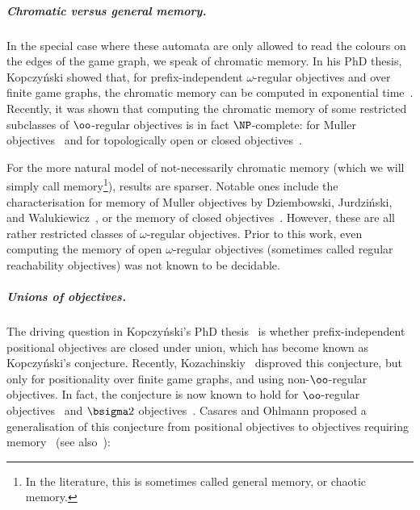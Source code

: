 \subparagraph*{Chromatic versus general memory.}
In the special case where these automata are only allowed to read the colours on the edges of the game graph, we speak of chromatic memory.
In his PhD thesis, Kopczy\'nski showed that, for prefix-independent $\omega$-regular objectives and over finite game graphs, the chromatic memory can be computed in exponential time~\cite[Theorem~8.14]{Kop08Thesis}.
Recently, it was shown that computing the chromatic memory of some restricted subclasses of $\oo$-regular objectives is in fact $\NP$-complete: for Muller objectives~\cite{Casares22Chromatic} and for topologically open or closed objectives~\cite{BFRV23Regular}.

For the more natural model of not-necessarily chromatic memory (which we will simply call memory\footnote{In the literature, this is sometimes called general memory, or chaotic memory.}), results are sparser. Notable ones include the characterisation for memory of Muller objectives by Dziembowski, Jurdzi\'nski, and Walukiewicz~\cite{DJW1997memory}, or the memory of closed objectives~\cite{CFH14}.
However, these are all rather restricted classes of $\omega$-regular objectives.
Prior to this work, even computing the memory of open $\omega$-regular objectives (sometimes called regular reachability objectives) was not known to be decidable.



\subparagraph{Unions of objectives.} The driving question in Kopczyński's PhD thesis~\cite{Kop08Thesis} is whether prefix-independent positional objectives are closed under union, which has become known as Kopczyński's conjecture. Recently, Kozachinskiy~\cite{Kozachinskiy24EnergyGroups} disproved this conjecture, but only for positionality over finite game graphs, and using non-$\oo$-regular objectives. In fact, the conjecture is now known to hold for $\oo$-regular objectives~\cite{CO24Positional} and $\bsigma 2$ objectives~\cite{OS24Sigma2}. 
Casares and Ohlmann proposed a generalisation of this conjecture from positional objectives to objectives requiring memory~\cite[Conjecture~7.1]{CO25LMCS} (see also~\cite[Proposition~8.11]{Kop08Thesis}):


